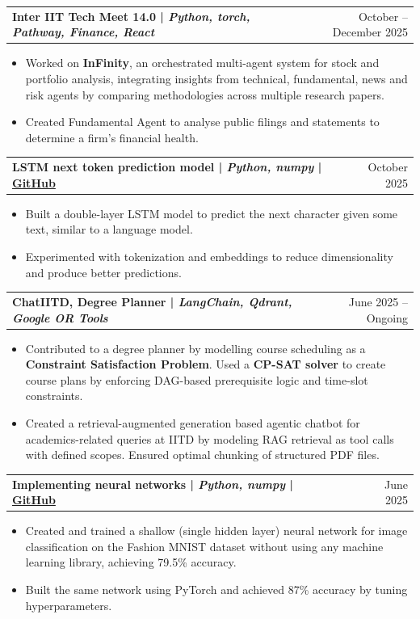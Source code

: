 \documentclass[a4paper,11pt]{article}
\makeatletter
\newenvironment{joblong}[2]
    {
    \begin{tabularx}{\linewidth}{@{}l X r@{}}
    \textbf{#1} & \hfill &  #2 \\[3.75pt]
    \end{tabularx}
    \begin{minipage}[t]{\linewidth}
    \begin{itemize}[nosep,after=\strut, leftmargin=1em, itemsep=0pt,label=--]
    }
    {
    \end{itemize}
    \end{minipage}  
    }
\makeatother
\begin{document}
\begin{joblong}{Inter IIT Tech Meet 14.0 | \small \textit{Python, torch, Pathway, Finance, React}}{October -- December 2025}
\item Worked on \textbf{InFinity}, an orchestrated multi-agent system for stock and portfolio analysis, integrating insights from technical, fundamental, news and risk agents by comparing methodologies across multiple research papers.
\item Created Fundamental Agent to analyse public filings and statements to determine a firm's financial health. 
\end{joblong}
\begin{joblong}{LSTM next token prediction model | \small \textit{Python, numpy} | \small \href{https://github.com/0xDevansh/lstm}{GitHub}}{October 2025}
\item Built a double-layer LSTM model to predict the next character given some text, similar to a language model.
\item Experimented with tokenization and embeddings to reduce dimensionality and produce better predictions.
\end{joblong}
\begin{joblong}{ChatIITD, Degree Planner | \small \textit{LangChain, Qdrant, Google OR Tools}}{June 2025 -- Ongoing}
\item Contributed to a degree planner by modelling course scheduling as a \textbf{Constraint Satisfaction Problem}. Used a \textbf{CP-SAT solver} to create course plans by enforcing DAG-based prerequisite logic and time-slot constraints.
\item Created a retrieval-augmented generation based agentic chatbot for academics-related queries at IITD by modeling RAG retrieval as tool calls with defined scopes. Ensured optimal chunking of structured PDF files.
\end{joblong}
\begin{joblong}{Implementing neural networks | \small \textit{Python, numpy} | \small \href{https://github.com/0xDevansh/Devansh-Aries-Study/blob/main/projects/fashion_mnist/fmnist_final.ipynb}{GitHub}}{June 2025}
\item Created and trained a shallow (single hidden layer) neural network for image classification on the Fashion MNIST dataset without using any machine learning library, achieving 79.5\% accuracy.
\item Built the same network using PyTorch and achieved 87\% accuracy by tuning hyperparameters.
\end{joblong}
\end{document}
